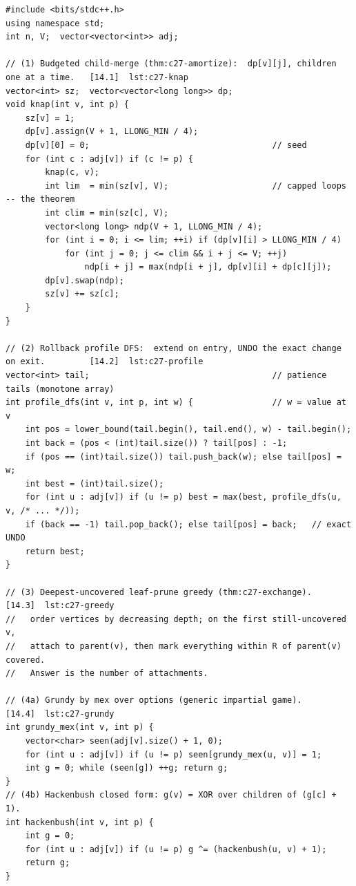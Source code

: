 \begin{lstlisting}[caption={Chapter 14 code kit: the capped child-merge, the rollback profile DFS, the deepest-uncovered greedy, the Grundy / Hackenbush fold, the two-flag trie DP, and the Summit's supply/demand 2-index DP}, label={lst:c27-kit}]
#include <bits/stdc++.h>
using namespace std;
int n, V;  vector<vector<int>> adj;

// (1) Budgeted child-merge (thm:c27-amortize):  dp[v][j], children one at a time.   [14.1]  lst:c27-knap
vector<int> sz;  vector<vector<long long>> dp;
void knap(int v, int p) {
    sz[v] = 1;
    dp[v].assign(V + 1, LLONG_MIN / 4);
    dp[v][0] = 0;                                     // seed
    for (int c : adj[v]) if (c != p) {
        knap(c, v);
        int lim  = min(sz[v], V);                     // capped loops -- the theorem
        int clim = min(sz[c], V);
        vector<long long> ndp(V + 1, LLONG_MIN / 4);
        for (int i = 0; i <= lim; ++i) if (dp[v][i] > LLONG_MIN / 4)
            for (int j = 0; j <= clim && i + j <= V; ++j)
                ndp[i + j] = max(ndp[i + j], dp[v][i] + dp[c][j]);
        dp[v].swap(ndp);
        sz[v] += sz[c];
    }
}

// (2) Rollback profile DFS:  extend on entry, UNDO the exact change on exit.         [14.2]  lst:c27-profile
vector<int> tail;                                     // patience tails (monotone array)
int profile_dfs(int v, int p, int w) {                // w = value at v
    int pos = lower_bound(tail.begin(), tail.end(), w) - tail.begin();
    int back = (pos < (int)tail.size()) ? tail[pos] : -1;
    if (pos == (int)tail.size()) tail.push_back(w); else tail[pos] = w;
    int best = (int)tail.size();
    for (int u : adj[v]) if (u != p) best = max(best, profile_dfs(u, v, /* ... */));
    if (back == -1) tail.pop_back(); else tail[pos] = back;   // exact UNDO
    return best;
}

// (3) Deepest-uncovered leaf-prune greedy (thm:c27-exchange).                        [14.3]  lst:c27-greedy
//   order vertices by decreasing depth; on the first still-uncovered v,
//   attach to parent(v), then mark everything within R of parent(v) covered.
//   Answer is the number of attachments.

// (4a) Grundy by mex over options (generic impartial game).                          [14.4]  lst:c27-grundy
int grundy_mex(int v, int p) {
    vector<char> seen(adj[v].size() + 1, 0);
    for (int u : adj[v]) if (u != p) seen[grundy_mex(u, v)] = 1;
    int g = 0; while (seen[g]) ++g; return g;
}
// (4b) Hackenbush closed form: g(v) = XOR over children of (g[c] + 1).
int hackenbush(int v, int p) {
    int g = 0;
    for (int u : adj[v]) if (u != p) g ^= (hackenbush(u, v) + 1);
    return g;
}


\end{lstlisting}
